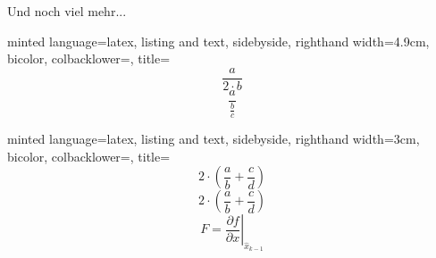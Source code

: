 \documentclass[
    ngerman,
    accentcolor=3b,
    dark_mode,
    fontsize= 12pt,
    a4paper,
    aspectratio=169,
    colorback=true,
    fancy_row_colors,
    leqno,
    fleqn,
    boxarc=3pt,
    fleqn,
]{algoslides}
\begin{document}
    \begin{frame}[fragile]
        \slidehead{}
        Und noch viel mehr...

        \vspace{\fill}
        \begin{center}
            \Large{}
        \end{center}
    \end{frame}


    \begin{frame}[c, fragile]
        \slidehead{}
        \begin{codeBlock}[
            ]{
            minted language=latex,
            listing and text,
            sidebyside,
            righthand width=4.9cm,
            bicolor,
            colbacklower=,
            title=
            }
            $$\frac{a}{2\cdot b}$$ %
            $$\frac{a}{\frac{b}{c}}$$ %
        \end{codeBlock}
    \end{frame}

    \begin{frame}[c, fragile]
        \slidehead{}
        \begin{codeBlock}[
            ]{
            minted language=latex,
            listing and text,
            sidebyside,
            righthand width=3cm,
            bicolor,
            colbacklower=,
            title=
            }
            $$2\cdot(\frac{a}{b}+\frac{c}{d})$$
            $$2\cdot\left(\frac{a}{b}+\frac{c}{d}\right)$$
            $$F=\left.
                \frac{\partial f}{\partial x}
                \right|_{\hat x_{k-1}}$$
        \end{codeBlock}
    \end{frame}

    \begin{frame}[fragile]
        \slidehead{}
        \vspace{\fill}
        \begin{center}
            \Large{}
        \end{center}
    \end{frame}
\end{document}
